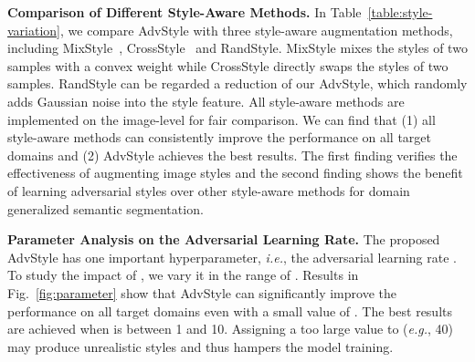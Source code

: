 \documentclass{article}
\newcommand{\ours}{AdvStyle\xspace}
\begin{document}
\textbf{Comparison of Different Style-Aware Methods.} In Table~\ref{table:style-variation}, we compare \ours with three style-aware augmentation methods, including MixStyle~\cite{zhou2021mixstyle}, CrossStyle~\cite{crossnorm} and RandStyle. MixStyle mixes the styles of two samples with a convex weight while CrossStyle directly swaps the styles of two samples. RandStyle can be regarded a reduction of our \ours, which randomly adds Gaussian noise into the style feature. All style-aware methods are implemented on the image-level for fair comparison. We can find that (1) all style-aware methods can consistently improve the performance on all target domains and (2) \ours achieves the best results. The first finding verifies the effectiveness of augmenting image styles and the second finding shows the benefit of learning adversarial styles over other style-aware methods for domain generalized semantic segmentation.



\textbf{Parameter Analysis on the Adversarial Learning Rate.}
The proposed \ours has one important hyperparameter, \textit{i.e.}, the adversarial learning rate . To study the impact of , we vary it in the range of . Results in Fig.~\ref{fig:parameter} show that \ours can significantly improve the performance on all target domains even with a small value of . The best results are achieved when  is between 1 and 10. Assigning a too large value to  (\textit{e.g.}, 40) may produce unrealistic styles and thus hampers the model training.
\end{document}

